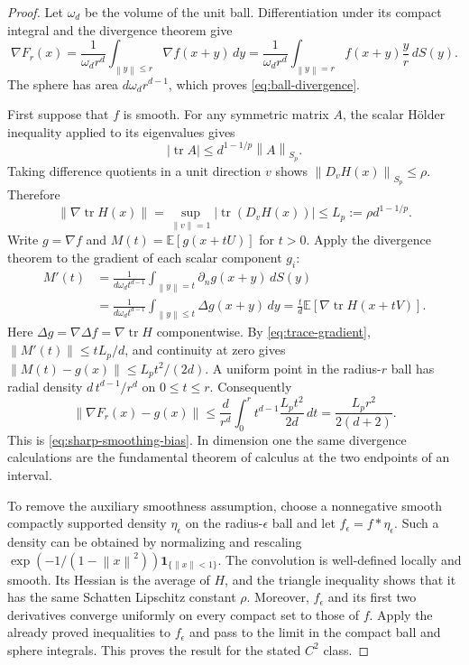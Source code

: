 \documentclass[11pt,a4paper]{article}
\newcommand{\E}{\mathbb E}
\newcommand{\norm}[1]{\left\lVert#1\right\rVert}
\newcommand{\tr}{\operatorname{tr}}
\theoremstyle{definition}
\theoremstyle{remark}
\begin{document}
\begin{proof}
Let $\omega_d$ be the volume of the unit ball. Differentiation under its compact integral and the divergence theorem give
\[
 \nabla F_r(x)
 =\frac{1}{\omega_dr^d}\int_{\norm y\le r}\nabla f(x+y)\,dy
 =\frac{1}{\omega_dr^d}\int_{\norm y=r}f(x+y)\frac yr\,dS(y).
\]
The sphere has area $d\omega_dr^{d-1}$, which proves \eqref{eq:ball-divergence}.

First suppose that $f$ is smooth. For any symmetric matrix $A$, the scalar H\"older inequality applied to its eigenvalues gives
\begin{equation}\label{eq:trace-holder}
 |\tr A|\le d^{1-1/p}\norm{A}_{S_p}.
\end{equation}
Taking difference quotients in a unit direction $v$ shows
$\norm{D_vH(x)}_{S_p}\le\rho$. Therefore
\begin{equation}\label{eq:trace-gradient}
 \norm{\nabla\tr H(x)}
 =\sup_{\norm v=1}|\tr(D_vH(x))|
 \le L_p:=\rho d^{1-1/p}.
\end{equation}
Write $g=\nabla f$ and $M(t)=\E[g(x+tU)]$ for $t>0$.
Apply the divergence theorem to the gradient of each scalar component $g_i$:
\begin{align*}
 M'(t)
 &=\frac{1}{d\omega_dt^{d-1}}\int_{\norm y=t}\partial_n g(x+y)\,dS(y)\\
 &=\frac{1}{d\omega_dt^{d-1}}\int_{\norm y\le t}\Delta g(x+y)\,dy
 =\frac t d\E[\nabla\tr H(x+tV)].
\end{align*}
Here $\Delta g=\nabla\Delta f=\nabla\tr H$ componentwise. By \eqref{eq:trace-gradient}, $\norm{M'(t)}\le tL_p/d$, and continuity at zero gives
$\norm{M(t)-g(x)}\le L_pt^2/(2d)$.
A uniform point in the radius-$r$ ball has radial density $d\,t^{d-1}/r^d$ on $0\le t\le r$. Consequently
\[
 \norm{\nabla F_r(x)-g(x)}
 \le\frac d{r^d}\int_0^r t^{d-1}\frac{L_pt^2}{2d}\,dt
 =\frac{L_pr^2}{2(d+2)}.
\]
This is \eqref{eq:sharp-smoothing-bias}. In dimension one the same divergence calculations are the fundamental theorem of calculus at the two endpoints of an interval.

To remove the auxiliary smoothness assumption, choose a nonnegative smooth compactly supported density $\eta_\epsilon$ on the radius-$\epsilon$ ball and let $f_\epsilon=f*\eta_\epsilon$. Such a density can be obtained by normalizing and rescaling $\exp(-1/(1-\norm x^2))\mathbf1_{\{\norm x<1\}}$.
The convolution is well-defined locally and smooth. Its Hessian is the average of $H$, and the triangle inequality shows that it has the same Schatten Lipschitz constant $\rho$. Moreover, $f_\epsilon$ and its first two derivatives converge uniformly on every compact set to those of $f$. Apply the already proved inequalities to $f_\epsilon$ and pass to the limit in the compact ball and sphere integrals. This proves the result for the stated $C^2$ class.
\end{proof}
\end{document}
